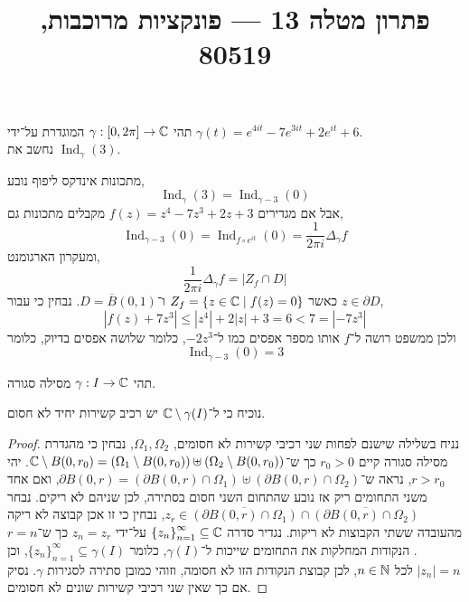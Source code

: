 
\title{פתרון מטלה 13 --- פונקציות מרוכבות, 80519}


\maketitle
\maketitleprint{}

\question{}
תהי $\gamma : [0, 2\pi] \to \mathbb{C}$ המוגדרת על־ידי $\gamma(t) = e^{4it} - 7e^{3it} + 2e^{it} + 6$. \\
נחשב את $\operatorname{Ind}_\gamma(3)$.
\begin{solution}
	מתכונות אינדקס ליפוף נובע,
	\[
		\operatorname{Ind}_\gamma(3)
		= \operatorname{Ind}_{\gamma - 3}(0)
	\]
	אבל אם מגדירים $f(z) = z^4 - 7z^3 + 2z + 3$ מקבלים מתכונות גם,
	\[
		\operatorname{Ind}_{\gamma - 3}(0)
		= \operatorname{Ind}_{f \circ e^{it}}(0)
		= \frac{1}{2\pi i} \Delta_\gamma f
	\]
	ומעקרון הארגומנט,
	\[
		\frac{1}{2\pi i} \Delta_\gamma f
		= |Z_f \cap D|
	\]
	כאשר $Z_f = \{ z \in \mathbb{C} \mid f(z) = 0 \}$ ו־$D = \overline{B}(0, 1)$.
	נבחין כי עבור $z \in \partial D$,
	\[
		|f(z) + 7z^3|
		\le |z^4| + 2 |z| + 3
		= 6
		< 7
		= |-7z^3|
	\]
	ולכן ממשפט רושה ל־$f$ אותו מספר אפסים כמו ל־$-2z^3$, כלומר שלושה אפסים בדיוק, כלומר
	\[
		\operatorname{Ind}_{\gamma - 3}(0)
		= 3
	\]
\end{solution}

\question{}
תהי $\gamma : I \to \mathbb{C}$ מסילה סגורה.

\subquestion{}
נוכיח כי ל־$\mathbb{C} \setminus \gamma(I)$ יש רכיב קשירות יחיד לא חסום.
\begin{proof}
	נניח בשלילה שישנם לפחות שני רכיבי קשירות לא חסומים, $\Omega_1, \Omega_2$, נבחין כי מהגדרת מסילה סגורה קיים $r_0 > 0$ כך ש־$\mathbb{C} \setminus B(0, r_0) = (\Omega_1 \setminus B(0, r_0)) \uplus (\Omega_2 \setminus B(0, r_0))$.
	יהי $r > r_0$, נראה ש־$\partial B(0, r) = (\partial B(0, r) \cap \Omega_1) \uplus (\partial B(0, r) \cap \Omega_2)$, ואם אחד משני התחומים ריק אז נובע שהתחום השני חסום בסתירה, לכן שניהם לא ריקים.
	נבחר $z_r \in \overline{(\partial B(0, r) \cap \Omega_1)} \cap \overline{(\partial B(0, r) \cap \Omega_2)}$, נבחין כי זו אכן קבוצה לא ריקה מהעובדה ששתי הקבוצות לא ריקות.
	נגדיר סדרה ${\{z_n\}}_{n = 1}^\infty \subseteq \mathbb{C}$ על־ידי $z_n = z_r$ כך ש־$r = n$.
	הנקודות המחלקות את התחומים שייכות ל־$\gamma(I)$, כלומר ${\{z_n\}}_{n = 1}^\infty \subseteq \gamma(I)$, וכן $|z_n| = n$ לכל $n \in \mathbb{N}$, לכן קבוצת הנקודות הזו לא חסומה, וזוהי כמובן סתירה לסגירות $\gamma$.
	נסיק אם כך שאין שני רכיבי קשירות שונים לא חסומים.
\end{proof}

